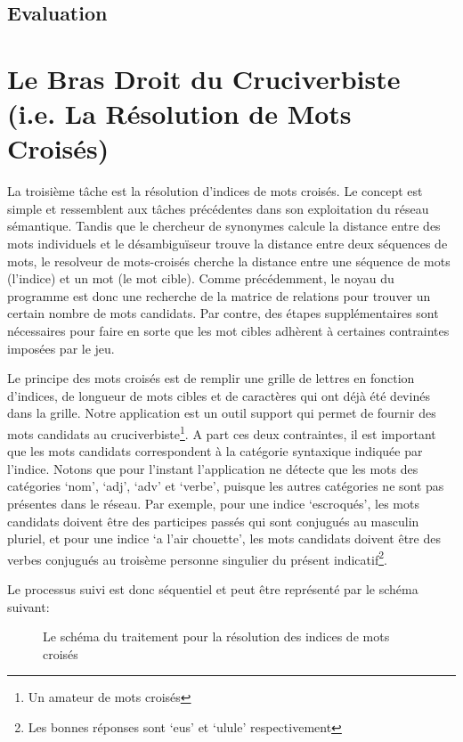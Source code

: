 \documentclass[a4paper, 12pt]{article}
\begin{document}
\subsection{Evaluation}


\section{Le Bras Droit du Cruciverbiste (i.e. La Résolution de Mots Croisés)}

La troisième tâche est la résolution d'indices de mots croisés. Le concept est simple et ressemblent aux tâches précédentes dans son exploitation du réseau sémantique. Tandis que le chercheur de synonymes calcule la distance entre des mots individuels et le désambiguïseur trouve la distance entre deux séquences de mots, le resolveur de mots-croisés cherche la distance entre une séquence de mots (l'indice) et un mot (le mot cible). Comme précédemment, le noyau du programme est donc une recherche de la matrice de relations pour trouver un certain nombre de mots candidats. Par contre, des étapes supplémentaires sont nécessaires pour faire en sorte que les mot cibles adhèrent à certaines contraintes imposées par le jeu.

Le principe des mots croisés est de remplir une grille de lettres en fonction d'indices, de longueur de mots cibles et de caractères qui ont déjà été devinés dans la grille. Notre application est un outil support qui permet de fournir des mots candidats au cruciverbiste\footnote{Un amateur de mots croisés}. A part ces deux contraintes, il est important que les mots candidats correspondent à la catégorie syntaxique indiquée par l'indice. Notons que pour l'instant l'application ne détecte que les mots des catégories \lq{nom}\rq, \lq{adj}\rq, \lq{adv}\rq{} et \lq{verbe}\rq, puisque les autres catégories ne sont pas présentes dans le réseau. Par exemple, pour une indice \lq{escroqués}\rq, les mots candidats doivent être des participes passés qui sont conjugués au masculin pluriel, et pour une indice \lq{a l'air chouette}\rq, les mots candidats doivent être des verbes conjugués au troisème personne singulier du présent indicatif\footnote{Les bonnes réponses sont \lq{eus}\rq{}  et \lq{ulule}\rq{} respectivement}.

Le processus suivi est donc séquentiel et peut être représenté par le schéma suivant:   

\begin{figure}[!ht]
\centering
\def\svgwidth{\columnwidth}

\caption{Le schéma du traitement pour la résolution des indices de mots croisés}
\label{fig:schema_crosswords}
\end{figure}
\end{document}
